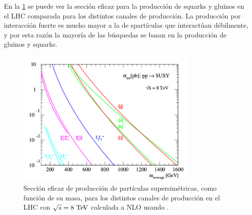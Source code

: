 



En la \cref{fig:xs_lhc_8tev} se puede ver la sección eficaz para la producción
de squarks y gluinos en el LHC comparada para los distintos canales de
producción. La producción por interacción fuerte es mucho mayor a la de
spartículas que interactúan débilmente, y por esta razón la mayoría de las
búsquedas se basan en la producción de gluinos y squarks.

\begin{figure}[!htbp]
  \centering
  \includegraphics[width=0.8\textwidth]{figures/susy_lhc_xs_8tev}
  \caption{Sección eficaz de producción de partículas supersimétricas, como
    función de su masa, para los distintos canales de producción en el LHC con
    $\sqrt{s} = 8 \tev$ calculada a NLO usando {\prospino} \cite{Beenakker:1996ed}.}
  \label{fig:xs_lhc_8tev}
\end{figure}


